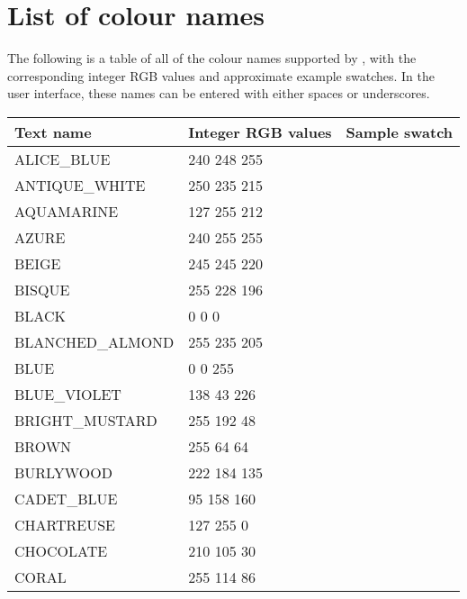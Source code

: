 \newpage
\section{List of colour names}
\label{app:colours}

The following is a table of all of the colour names supported by
\display{}, with the corresponding integer RGB values and approximate example
swatches. In the user interface, these names can be entered with either
spaces or underscores.

\begin{longtable}{l|l|l}
{\bf Text name} & {\bf Integer RGB values} & {\bf Sample swatch}\\
\hline
ALICE\_BLUE & 240 248 255 & \colorbox[RGB]{240 248 255}{\phantom{MMMMMMMM}}\\
ANTIQUE\_WHITE & 250 235 215 & \colorbox[RGB]{250 235 215}{\phantom{MMMMMMMM}}\\
AQUAMARINE & 127 255 212 & \colorbox[RGB]{127 255 212}{\phantom{MMMMMMMM}}\\
AZURE & 240 255 255 & \colorbox[RGB]{240 255 255}{\phantom{MMMMMMMM}}\\
BEIGE & 245 245 220 & \colorbox[RGB]{245 245 220}{\phantom{MMMMMMMM}}\\
BISQUE & 255 228 196 & \colorbox[RGB]{255 228 196}{\phantom{MMMMMMMM}}\\
BLACK & 0 0 0 & \colorbox[RGB]{0 0 0}{\phantom{MMMMMMMM}}\\
BLANCHED\_ALMOND & 255 235 205 & \colorbox[RGB]{255 235 205}{\phantom{MMMMMMMM}}\\
BLUE & 0 0 255 & \colorbox[RGB]{0 0 255}{\phantom{MMMMMMMM}}\\
BLUE\_VIOLET & 138 43 226 & \colorbox[RGB]{138 43 226}{\phantom{MMMMMMMM}}\\
BRIGHT\_MUSTARD & 255 192 48 & \colorbox[RGB]{255 192 48}{\phantom{MMMMMMMM}}\\
BROWN & 255 64 64 & \colorbox[RGB]{255 64 64}{\phantom{MMMMMMMM}}\\
BURLYWOOD & 222 184 135 & \colorbox[RGB]{222 184 135}{\phantom{MMMMMMMM}}\\
CADET\_BLUE & 95 158 160 & \colorbox[RGB]{95 158 160}{\phantom{MMMMMMMM}}\\
CHARTREUSE & 127 255 0 & \colorbox[RGB]{127 255 0}{\phantom{MMMMMMMM}}\\
CHOCOLATE & 210 105 30 & \colorbox[RGB]{210 105 30}{\phantom{MMMMMMMM}}\\
CORAL & 255 114 86 & \colorbox[RGB]{255 114 86}{\phantom{MMMMMMMM}}\\

\end{longtable}
